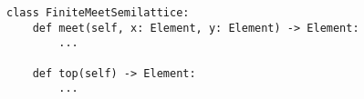\begin{verbatim}
class FiniteMeetSemilattice:
    def meet(self, x: Element, y: Element) -> Element:
        ...

    def top(self) -> Element:
        ...
\end{verbatim}